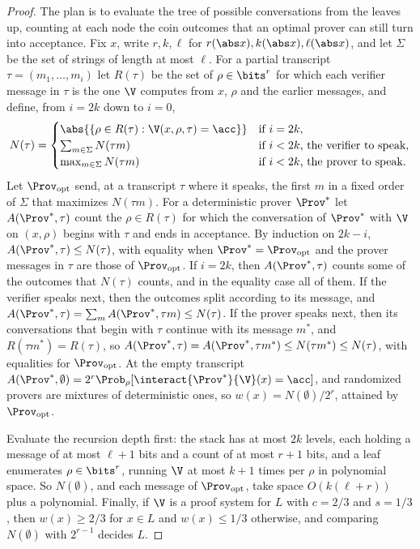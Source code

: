 \begin{refsection}
\begin{proof}
The plan is to evaluate the tree of possible conversations from the leaves up, counting at each node the coin outcomes that an optimal prover can still turn into acceptance. Fix $x$, write $r,k,\ell$ for $r(\abs x),k(\abs x),\ell(\abs x)$, and let $\Sigma$ be the set of strings of length at most $\ell$. For a partial transcript $\tau=(m_1,\dots,m_i)$ let $R(\tau)$ be the set of $\rho\in\bits^r$ for which each verifier message in $\tau$ is the one $\V$ computes from $x$, $\rho$ and the earlier messages, and define, from $i=2k$ down to $i=0$,
\[
  N(\tau)=\begin{cases}
  \abs{\{\rho\in R(\tau):\V(x,\rho,\tau)=\acc\}} & \text{if }i=2k,\\
  \sum_{m\in\Sigma}N(\tau m) & \text{if }i<2k\text{, the verifier to speak},\\
  \max_{m\in\Sigma}N(\tau m) & \text{if }i<2k\text{, the prover to speak}.
  \end{cases}
\]
Let $\Prov_{\mathrm{opt}}$ send, at a transcript $\tau$ where it speaks, the first $m$ in a fixed order of $\Sigma$ that maximizes $N(\tau m)$. For a deterministic prover $\Prov^*$ let $A(\Prov^*,\tau)$ count the $\rho\in R(\tau)$ for which the conversation of $\Prov^*$ with $\V$ on $(x,\rho)$ begins with $\tau$ and ends in acceptance. By induction on $2k-i$, $A(\Prov^*,\tau)\le N(\tau)$, with equality when $\Prov^*=\Prov_{\mathrm{opt}}$ and the prover messages in $\tau$ are those of $\Prov_{\mathrm{opt}}$. If $i=2k$, then $A(\Prov^*,\tau)$ counts some of the outcomes that $N(\tau)$ counts, and in the equality case all of them. If the verifier speaks next, then the outcomes split according to its message, and $A(\Prov^*,\tau)=\sum_mA(\Prov^*,\tau m)\le N(\tau)$. If the prover speaks next, then its conversations that begin with $\tau$ continue with its message $m^*$, and $R(\tau m^*)=R(\tau)$, so $A(\Prov^*,\tau)=A(\Prov^*,\tau m^*)\le N(\tau m^*)\le N(\tau)$, with equalities for $\Prov_{\mathrm{opt}}$. At the empty transcript $A(\Prov^*,\emptyset)=2^r\Prob_\rho[\interact{\Prov^*}{\V}(x)=\acc]$, and randomized provers are mixtures of deterministic ones, so $w(x)=N(\emptyset)/2^r$, attained by $\Prov_{\mathrm{opt}}$.

Evaluate the recursion depth first: the stack has at most $2k$ levels, each holding a message of at most $\ell+1$ bits and a count of at most $r+1$ bits, and a leaf enumerates $\rho\in\bits^r$, running $\V$ at most $k+1$ times per $\rho$ in polynomial space. So $N(\emptyset)$, and each message of $\Prov_{\mathrm{opt}}$, take space $O(k(\ell+r))$ plus a polynomial. Finally, if $\V$ is a proof system for $L$ with $c=2/3$ and $s=1/3$, then $w(x)\ge2/3$ for $x\in L$ and $w(x)\le1/3$ otherwise, and comparing $N(\emptyset)$ with $2^{r-1}$ decides $L$.
\end{proof}


\end{refsection}
